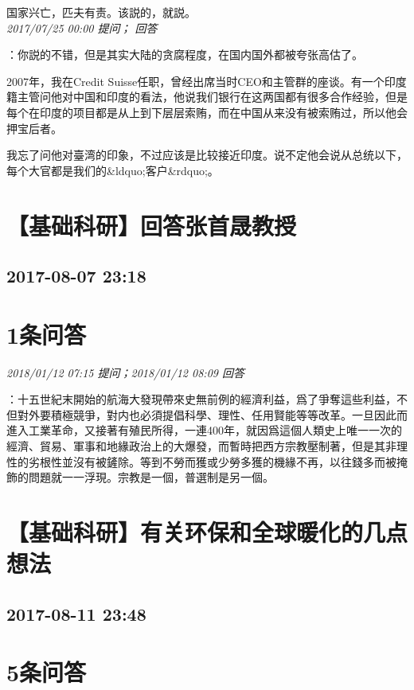 \documentclass[twocolumn]{ctexart}
\begin{document}
国家兴亡，匹夫有责。该説的，就説。\\

\textit{\hfill\noindent\small 2017/07/25 00:00 提问； 回答}

：你説的不错，但是其实大陆的贪腐程度，在国内国外都被夸张高估了。

2007年，我在Credit Suisse任职，曾经出席当时CEO和主管群的座谈。有一个印度籍主管问他对中国和印度的看法，他说我们银行在这两国都有很多合作经验，但是每个在印度的项目都是从上到下层层索贿，而在中国从来没有被索贿过，所以他会押宝后者。

我忘了问他对臺湾的印象，不过应该是比较接近印度。说不定他会说从总统以下，每个大官都是我们的\&ldquo;客户\&rdquo;。\\


\section{【基础科研】回答张首晟教授}
\subsection{2017-08-07 23:18}


\section{1条问答}

\textit{\hfill\noindent\small 2018/01/12 07:15 提问；2018/01/12 08:09 回答}

：十五世紀末開始的航海大發現帶來史無前例的經濟利益，爲了爭奪這些利益，不但對外要積極競爭，對内也必須提倡科學、理性、任用賢能等等改革。一旦因此而進入工業革命，又接著有殖民所得，一連400年，就因爲這個人類史上唯一一次的經濟、貿易、軍事和地緣政治上的大爆發，而暫時把西方宗教壓制著，但是其非理性的劣根性並沒有被鏟除。等到不勞而獲或少勞多獲的機緣不再，以往錢多而被掩飾的問題就一一浮現。宗教是一個，普選制是另一個。
\\


\section{【基础科研】有关环保和全球暖化的几点想法}
\subsection{2017-08-11 23:48}


\section{5条问答}
\end{document}
